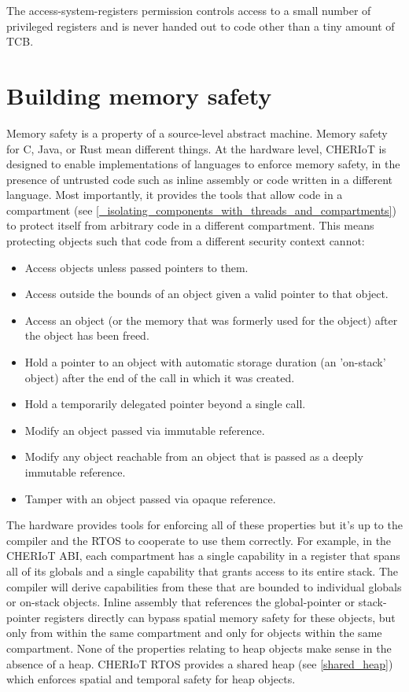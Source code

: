 The access-system-registers permission controls access to a small number of privileged registers and is never handed out to code other than a tiny amount of TCB.

\section{Building memory safety}

Memory safety is a property of a source-level abstract machine.
Memory safety for C, Java, or Rust mean different things.
At the hardware level, CHERIoT is designed to enable implementations of languages to enforce memory safety, in the presence of untrusted code such as inline assembly or code written in a different language.
Most importantly, it provides the tools that allow code in a compartment (see \ref{_isolating_components_with_threads_and_compartments}) to protect itself from arbitrary code in a different compartment.
This means protecting objects such that code from a different security context cannot:

\begin{itemize}
	\item{Access objects unless passed pointers to them.}
	\item{Access outside the bounds of an object given a valid pointer to that object.}
	\item{Access an object (or the memory that was formerly used for the object) after the object has been freed.}
	\item{Hold a pointer to an object with automatic storage duration (an 'on-stack' object) after the end of the call in which it was created.}
	\item{Hold a temporarily delegated pointer beyond a single call.}
	\item{Modify an object passed via immutable reference.}
	\item{Modify any object reachable from an object that is passed as a deeply immutable reference.}
	\item{Tamper with an object passed via opaque reference.}
\end{itemize}

The hardware provides tools for enforcing all of these properties but it's up to the compiler and the RTOS to cooperate to use them correctly.
For example, in the CHERIoT ABI, each compartment has a single capability in a register that spans all of its globals and a single capability that grants access to its entire stack.
The compiler will derive capabilities from these that are bounded to individual globals or on-stack objects.
Inline assembly that references the global-pointer or stack-pointer registers directly can bypass spatial memory safety for these objects, but only from within the same compartment and only for objects within the same compartment.
None of the properties relating to heap objects make sense in the absence of a heap.
CHERIoT RTOS provides a shared heap (see \ref{shared_heap}) which enforces spatial and temporal safety for heap objects.

